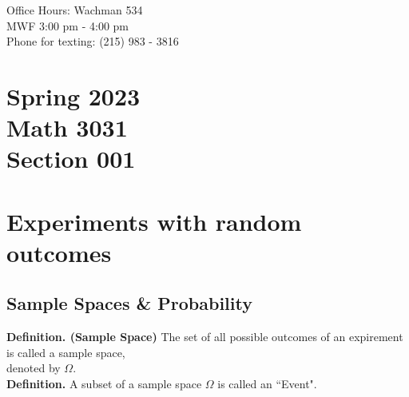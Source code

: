 \documentclass[12pt]{book}
\begin{document}
\vspace{50pt}

\begin{center}
Office Hours: Wachman 534\\
MWF 3:00 pm - 4:00 pm\\
Phone for texting: (215) 983 - 3816\\
\end{center}


%
\chapter*{\center \normalsize Spring 2023\\
Math 3031\\
Section 001\\}
%
















%
\tableofcontents
%
\mainmatter
%











\chapter{Experiments with random outcomes}
\section{Sample Spaces \& Probability}
\textbf{Definition. (Sample Space)}  The set of all possible outcomes of an expirement is called a sample space, \\denoted by $\Omega$.\\

\noindent \textbf{Definition.} A subset of a sample space $\Omega$ is called an ``Event". 
\end{document}

